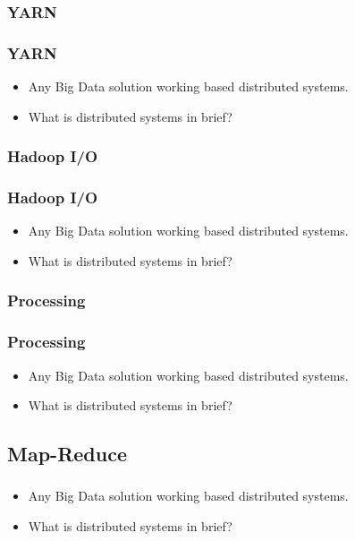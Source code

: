 
\subsubsection{YARN}
\begin{frame}
\frametitle{YARN}
\begin{itemize}[<+->]
	\item Any Big Data solution working based distributed systems.
	\item What is distributed systems in brief?
\end{itemize}
\end{frame}


\subsubsection{Hadoop I/O}
\begin{frame}
\frametitle{Hadoop I/O}
\begin{itemize}[<+->]
	\item Any Big Data solution working based distributed systems.
	\item What is distributed systems in brief?
\end{itemize}
\end{frame}


\subsubsection{Processing}
\begin{frame}
\frametitle{Processing}
\begin{itemize}[<+->]
	\item Any Big Data solution working based distributed systems.
	\item What is distributed systems in brief?
\end{itemize}
\end{frame}


\subsection{Map-Reduce}
\begin{frame}
\frametitle{\subsecname}
\begin{itemize}[<+->]
	\item Any Big Data solution working based distributed systems.
	\item What is distributed systems in brief?
\end{itemize}
\end{frame}

